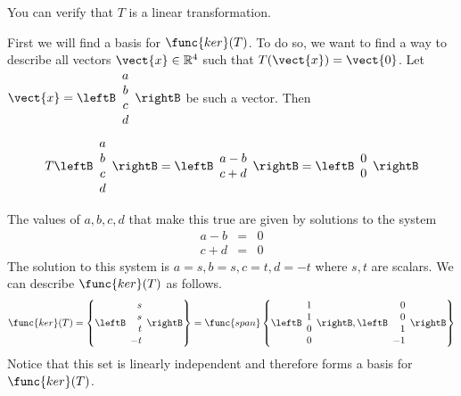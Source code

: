 \begin{solution}
You can verify that $T$ is a linear transformation.

First we will find a basis for $\func{ker}(T)$. To do so, we want to find a way to describe all vectors $\vect{x} \in \mathbb{R}^4$ such that $T(\vect{x}) = \vect{0}$. Let $\vect{x} =  \leftB \begin{array}{c}
a \\
b \\
c \\
d
\end{array} \rightB$ be such a vector. Then
\[
T \leftB \begin{array}{c}
a \\
b \\
c \\
d
\end{array} \rightB = 
\leftB \begin{array}{c}
a - b \\ 
c + d
\end{array} \rightB = 
\leftB \begin{array}{c}
0 \\ 
0
\end{array} \rightB
\]

The values of $a, b, c, d$ that make this true are given by solutions to the system 
\begin{eqnarray*}
a - b &=& 0 \\
c + d &=& 0
\end{eqnarray*}
The solution to this system is $ a = s, b = s, c = t, d = -t$ where $s, t$ are scalars. We can describe $\func{ker}(T)$ as follows.
\[
\func{ker}(T) = \left\{ \leftB \begin{array}{r}
s \\ 
s \\
t \\
-t 
\end{array} \rightB \right\}
=
\func{span} \left\{ \leftB \begin{array}{r}
1 \\
1 \\
0 \\
0 
\end{array} \rightB, \leftB \begin{array}{r}
0 \\
0 \\
1 \\
-1
\end{array} \rightB \right\}
\]
Notice that this set is linearly independent and therefore forms a basis for $\func{ker}(T)$. 


\end{solution}
